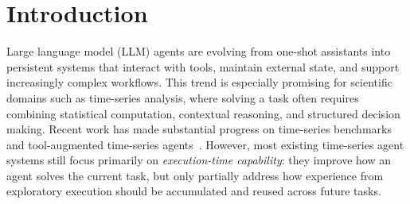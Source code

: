 %


\section{Introduction}
\label{sec:intro}

Large language model (LLM) agents are evolving from one-shot assistants into persistent systems that interact with tools, maintain external state, and support increasingly complex workflows. This trend is especially promising for scientific domains such as time-series analysis, where solving a task often requires combining statistical computation, contextual reasoning, and structured decision making. Recent work has made substantial progress on time-series benchmarks and tool-augmented time-series agents~\cite{mtbench,temporalbench,timeart,tsagent,tssci}. However, most existing time-series agent systems still focus primarily on \emph{execution-time capability}: they improve how an agent solves the current task, but only partially address how experience from exploratory execution should be accumulated and reused across future tasks.

